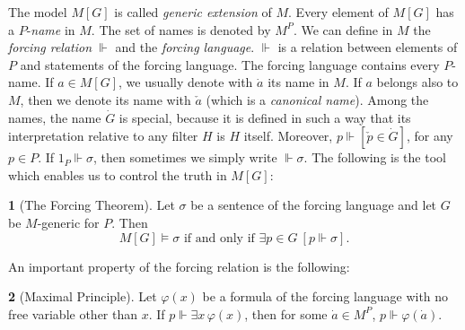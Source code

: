 \documentclass[11pt,a4paper]{report}
\theoremstyle{definition}
\theoremstyle{num.custom-title}
\theoremstyle{custom-title}
\newtheorem*{teo_custom-title_nonum}{}
\renewcommand{\phi}{\varphi}
\newcommand{\forces}{\Vdash}
\begin{document}
The model $M[G]$ is called \emph{generic extension} of $M$. Every element of $M[G]$ has a $P$-\emph{name} in $M$. The set of names is denoted by $M^P$. We can define in $M$ the \emph{forcing relation} $\forces$ and the \emph{forcing language}. $\forces$ is a relation between elements of $P$ and statements of the forcing language. The forcing language contains every $P$-name. If $a \in M[G]$, we usually denote with $\dot{a}$ its name in $M$. If $a$ belongs also to $M$, then we denote its name with $\check{a}$ (which is a \emph{canonical name}). Among the names, the name $\dot{G}$ is special, because it is defined in such a way that its interpretation relative to any filter $H$ is $H$ itself. Moreover, $p \forces [\check{p} \in \dot{G}]$, for any $p \in P$. If $1_P \forces \sigma$, then sometimes we simply write $\forces \sigma$. The following is the tool which enables us to control the truth in $M[G]$:

\begin{teo_custom-title_nonum}[The Forcing Theorem]
Let $\sigma$ be a sentence of the forcing language and let $G$ be $M$-generic for $P$. Then
\[
M[G] \models \sigma \text{ if and only if } \exists p \in G \ [p \forces \sigma].
\]
\end{teo_custom-title_nonum}

An important property of the forcing relation is the following:
\begin{teo_custom-title_nonum}[Maximal Principle]
Let $\phi(x)$ be a formula of the forcing language with no free variable other than $x$. If $p \forces \exists x \, \phi(x)$, then for some $\dot{a} \in M^P$, $p \forces \phi(\dot{a})$.
\end{teo_custom-title_nonum}
\end{document}
